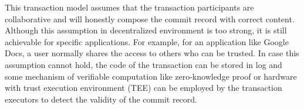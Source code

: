 This transaction model assumes that the transaction participants are collaborative and will honestly compose the commit record with correct content.
Although this assumption in decentralized environment is too strong, it is still achievable for specific applications. 
For example, for an application like Google Docs, a user normally shares the access to others who can be trusted. 
In case this assumption cannot hold, the code of the transaction can be stored in \project log and some mechanism of verifiable computation like zero-knowledge proof or hardware with trust execution environment (TEE) can be employed by the transaction executors to detect the validity of the commit record.

